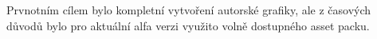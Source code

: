 \label{sec:grafika}
Prvnotním cílem bylo kompletní vytvoření autorské grafiky, ale z časových důvodů bylo pro aktuální alfa verzi využito volně dostupného asset packu. \cite{unity_asset}